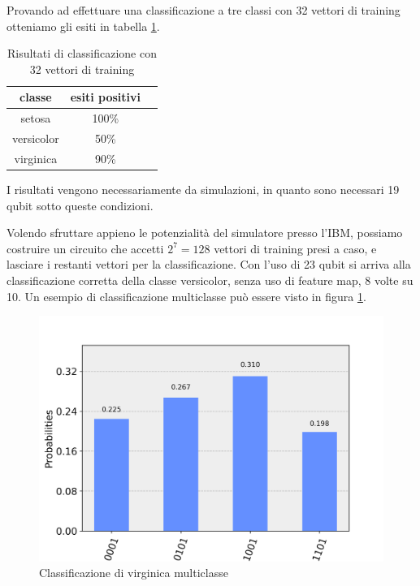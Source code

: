 Provando ad effettuare una classificazione a tre classi con 32 vettori di 
training otteniamo gli esiti in tabella \ref{table:misure}. 

\begin{table}[h!]
    \centering
    \begin{tabular}{c c c}
        classe & esiti positivi \\ 
        \hline
        setosa & 100\% \\ 
        versicolor & 50\% \\ 
        virginica & 90\% 
    \end{tabular}
    \caption{Risultati di classificazione con 32 vettori di training}
    \label{table:misure}
\end{table}

I risultati vengono necessariamente da simulazioni, in quanto sono necessari 
19 qubit sotto queste condizioni. 

Volendo sfruttare appieno le potenzialità del simulatore presso l'IBM, 
possiamo costruire un circuito che accetti $2^7 = 128$ vettori di training 
presi a caso, e lasciare i restanti vettori per la classificazione. 
Con l'uso di 23 qubit si arriva alla classificazione corretta della classe versicolor, 
senza uso di feature map, 8 volte su 10. 
Un esempio di classificazione multiclasse può essere visto in figura \ref{fig:multiclasse}. 

\begin{figure}[h!]
    \centering
    \includegraphics[width=\linewidth]{gfx/multiclass_virginica}
    \caption{Classificazione di virginica multiclasse}
    \label{fig:multiclasse}
\end{figure}